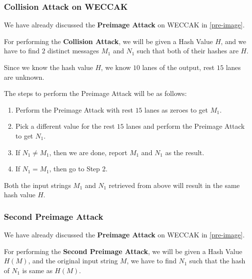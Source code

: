 \documentclass[10pt,twoside]{article}
\newcommand\bold\textbf
\begin{document}
\subsubsection{Collision Attack on WECCAK}

We have already discussed the \bold{Preimage Attack} on WECCAK in \cref{pre-image}. \newline

For performing the \bold{Collision Attack}, we will be given a Hash Value $H$, and we have to find $2$ distinct messages $M_1$ and $N_1$ such that both of their hashes are $H$.

\begin{solution}
  Since we know the hash value $H$, we know $10$ lanes of the output, rest $15$ lanes are unknown.

  The steps to perform the Preimage Attack will be as follows:
  \begin{enumerate}
    \setlength\itemsep{0em}
    \item Perform the Preimage Attack with rest $15$ lanes as zeroes to get $M_1$.
    \item Pick a different value for the rest $15$ lanes and perform the Preimage Attack to get $N_1$.
    \item If $N_1 \neq M_1$, then we are done, report $M_1$ and $N_1$ as the result.
    \item If $N_1 = M_1$, then go to Step 2.
  \end{enumerate}

  Both the input strings $M_1$ and $N_1$ retrieved from above will result in the same hash value $H$.
\end{solution}

\subsubsection{Second Preimage Attack}

We have already discussed the \bold{Preimage Attack} on WECCAK in \cref{pre-image}. \newline

For performing the \bold{Second Preimage Attack}, we will be given a Hash Value $H(M)$, and the original input string $M$, we have to find $N_1$ such that the hash of $N_1$ is same as $H(M)$.
\end{document}
